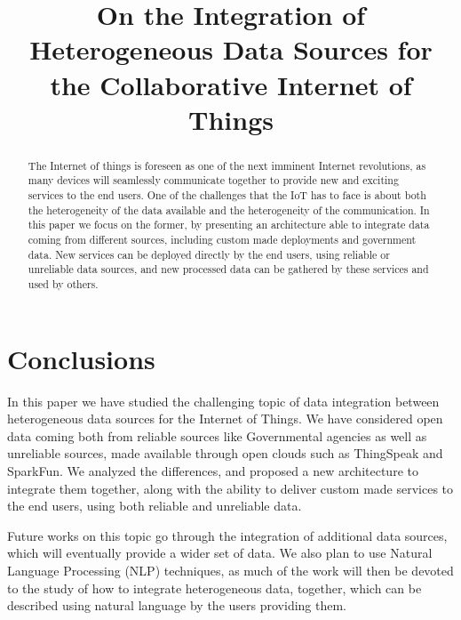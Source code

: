 \documentclass[conference]{IEEEtran}
\title{On the Integration of Heterogeneous Data Sources for the Collaborative Internet of Things}
\author{\IEEEauthorblockN{Federico Montori, Luca Bedogni, Luciano Bononi
\IEEEauthorblockA{
Department of Computer Science and Engineering (DISI)\\
University of Bologna, Italy\\
Email: \{federico.montori2, luca.bedogni4, luciano.bononi\}@unibo.it}}
}
\begin{document}
\maketitle

\begin{abstract}
The Internet of things is foreseen as one of the next imminent Internet revolutions, as many devices will seamlessly communicate together to provide new and exciting services to the end users. One of the challenges that the IoT has to face is about both the heterogeneity of the data available and the heterogeneity of the communication. In this paper we focus on the former, by presenting an architecture able to integrate data coming from different sources, including custom made deployments and government data. New services can be deployed directly by the end users, using reliable or unreliable data sources, and new processed data can be gathered by these services and used by others.

\end{abstract}











\section{Conclusions}
\label{sec:conclusions}

In this paper we have studied the challenging topic of data integration between heterogeneous data sources for the Internet of Things. We have considered open data coming both from reliable sources like Governmental agencies as well as unreliable sources, made available through open clouds such as ThingSpeak and SparkFun. We analyzed the differences, and proposed a new architecture to integrate them together, along with the ability to deliver custom made services to the end users, using both reliable and unreliable data.

Future works on this topic go through the integration of additional data sources, which will eventually provide a wider set of data. We also plan to use Natural Language Processing (NLP) techniques, as much of the work will then be devoted to the study of how to integrate heterogeneous data, together, which can be described using natural language by the users providing them.







\end{document}
